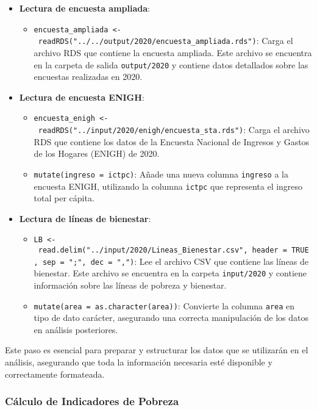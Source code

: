 \documentclass[
  12pt,
]{book}
\providecommand{\tightlist}{%
  \setlength{\itemsep}{0pt}\setlength{\parskip}{0pt}}
\begin{document}
\begin{itemize}
\tightlist
\item
  \textbf{Lectura de encuesta ampliada}:

  \begin{itemize}
  \tightlist
  \item
    \texttt{encuesta\_ampliada\ \textless{}-\ readRDS("../../output/2020/encuesta\_ampliada.rds")}: Carga el archivo RDS que contiene la encuesta ampliada. Este archivo se encuentra en la carpeta de salida \texttt{output/2020} y contiene datos detallados sobre las encuestas realizadas en 2020.
  \end{itemize}
\item
  \textbf{Lectura de encuesta ENIGH}:

  \begin{itemize}
  \tightlist
  \item
    \texttt{encuesta\_enigh\ \textless{}-\ readRDS("../input/2020/enigh/encuesta\_sta.rds")}: Carga el archivo RDS que contiene los datos de la Encuesta Nacional de Ingresos y Gastos de los Hogares (ENIGH) de 2020.
  \item
    \texttt{mutate(ingreso\ =\ ictpc)}: Añade una nueva columna \texttt{ingreso} a la encuesta ENIGH, utilizando la columna \texttt{ictpc} que representa el ingreso total per cápita.
  \end{itemize}
\item
  \textbf{Lectura de líneas de bienestar}:

  \begin{itemize}
  \tightlist
  \item
    \texttt{LB\ \textless{}-\ read.delim("../input/2020/Lineas\_Bienestar.csv",\ header\ =\ TRUE,\ sep\ =\ ";",\ dec\ =\ ",")}: Lee el archivo CSV que contiene las líneas de bienestar. Este archivo se encuentra en la carpeta \texttt{input/2020} y contiene información sobre las líneas de pobreza y bienestar.
  \item
    \texttt{mutate(area\ =\ as.character(area))}: Convierte la columna \texttt{area} en tipo de dato carácter, asegurando una correcta manipulación de los datos en análisis posteriores.
  \end{itemize}
\end{itemize}

Este paso es esencial para preparar y estructurar los datos que se utilizarán en el análisis, asegurando que toda la información necesaria esté disponible y correctamente formateada.

\hypertarget{cuxe1lculo-de-indicadores-de-pobreza}{%
\subsubsection*{Cálculo de Indicadores de Pobreza}\label{cuxe1lculo-de-indicadores-de-pobreza}}
\end{document}
